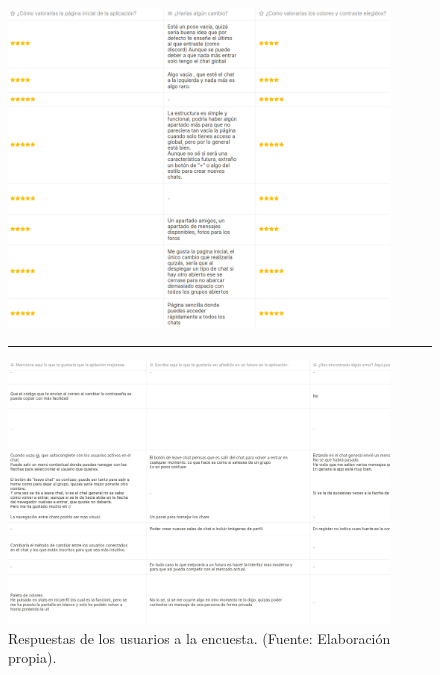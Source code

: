 \begin{itemize}
	\begin{figure}[h]
		\centering
		\includegraphics[width=0.9\textwidth]{res/images/resultados-encuesta-1}
		\vspace{1em}
		\hrule
		\vspace{1em}
		\includegraphics[width=0.9\textwidth]{res/images/resultados-encuesta-2}
		\caption{Respuestas de los usuarios a la encuesta. (Fuente: Elaboración propia).}
		\label{fig:resultados-encuesta}
	\end{figure}
\end{itemize}
